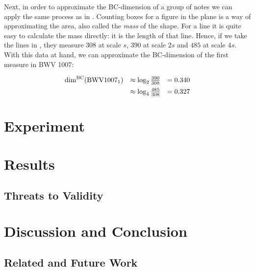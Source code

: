   Next, in order to approximate the BC-dimension of a group of notes
we can apply the same process as in . Counting boxes for
a figure in the plane is a way of approximating the area, also called
the \emph{mass} of the shape. For a line it is quite easy to calculate
the mass directly: it is the length of that line. Hence, if we take 
the lines in , they measure $308$ at scale
$s$, $390$ at scale $2s$ and $485$ at scale $4s$. With this data
at hand, we can approximate the BC-dimension of the first measure in
BWV 1007:

\[
\begin{array}{l l l}
 \mathrm{dim}^{\mathrm{BC}} (\mathrm{BWV1007}_1)  &\approx \log_2 \frac{390}{308} &= 0.340 \\[.5em]
                              &\approx \log_4 \frac{485}{308} &= 0.327 \\
\end{array}
\]


\section{Experiment}


\section{Results}


\subsection{Threats to Validity}


\section{Discussion and Conclusion}

\subsection{Related and Future Work}

